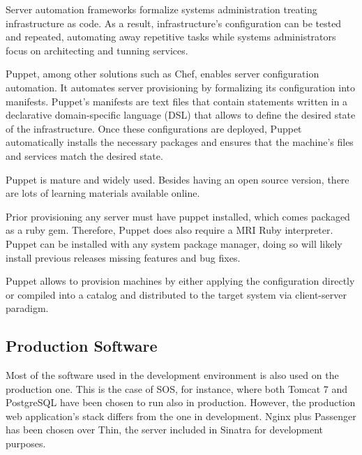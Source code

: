 Server automation frameworks formalize systems administration treating infrastructure as code. As a result, infrastructure's configuration can be tested and repeated, automating away repetitive tasks while systems administrators focus on architecting and tunning services.

Puppet, among other solutions such as Chef, enables server configuration automation. It automates server provisioning by formalizing its configuration into manifests. Puppet's manifests are text files that contain statements written in a declarative domain-specific language (DSL) that allows to define the desired state of the infrastructure. Once these configurations are deployed, Puppet automatically installs the necessary packages and ensures that the machine’s files and services match the desired state.


Puppet is mature and widely used. Besides having an open source version, there are lots of learning materials available online.

Prior provisioning any server must have puppet installed, which comes packaged as a ruby gem. Therefore, Puppet does also require a MRI Ruby interpreter. Puppet can be installed with any system package manager, doing so will likely install previous releases missing features and bug fixes.

Puppet allows to provision machines by either applying the configuration directly or compiled into a catalog and distributed to the target system via client-server paradigm.

\subsection*{Production Software}

Most of the software used in the development environment is also used on the production one. This is the case of SOS, for instance, where both Tomcat 7 and PostgreSQL have been chosen to run also in production. However, the production web application's stack differs from the one in development. Nginx plus Passenger has been chosen over Thin, the server included in Sinatra for development purposes.

